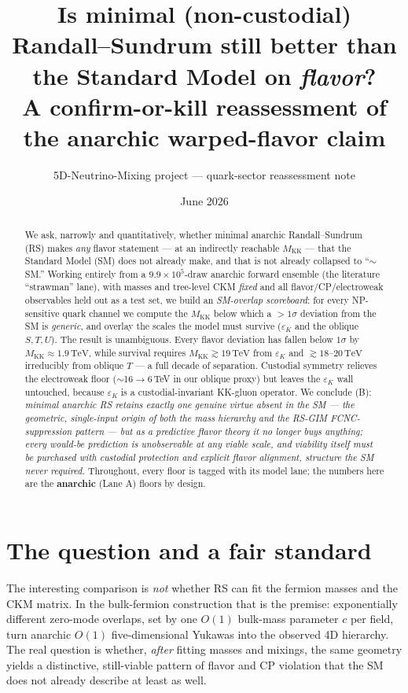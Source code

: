 \documentclass[11pt]{article}
\title{\bf Is minimal (non-custodial) Randall--Sundrum still better than the
Standard Model on \emph{flavor}?\\[4pt]
\large A confirm-or-kill reassessment of the anarchic warped-flavor claim}
\author{5D-Neutrino-Mixing project --- quark-sector reassessment note}
\date{June 2026}
\newcommand{\MKK}{M_{\mathrm{KK}}}
\newcommand{\epsK}{\varepsilon_K}
\newcommand{\TeV}{\,\mathrm{TeV}}
\begin{document}
\maketitle

\begin{abstract}
\noindent
We ask, narrowly and quantitatively, whether minimal anarchic Randall--Sundrum
(RS) makes \emph{any} flavor statement --- at an indirectly reachable
$\MKK$ --- that the Standard Model (SM) does not already make, and that is not
already collapsed to ``$\sim$\,SM.'' Working entirely from a $9.9\times10^{5}$-draw
anarchic forward ensemble (the literature ``strawman'' lane), with masses and
tree-level CKM \emph{fixed} and all flavor/CP/electroweak observables held out as
a test set, we build an \emph{SM-overlap scoreboard}: for every NP-sensitive
quark channel we compute the $\MKK$ below which a $>1\sigma$ deviation from the SM
is \emph{generic}, and overlay the scales the model must survive
($\epsK$ and the oblique $S,T,U$). The result is unambiguous. Every flavor
deviation has fallen below $1\sigma$ by $\MKK\!\approx\!1.9\TeV$, while survival
requires $\MKK\!\gtrsim\!19\TeV$ from $\epsK$ and $\gtrsim\!18\text{--}20\TeV$
irreducibly from oblique $T$ --- a full decade of separation. Custodial symmetry
relieves the electroweak floor ($\sim$16$\to$6\,TeV in our oblique proxy) but
leaves the $\epsK$ wall untouched, because $\epsK$ is a custodial-invariant
KK-gluon operator. We conclude (B): \emph{minimal anarchic RS retains exactly one
genuine virtue absent in the SM --- the geometric, single-input origin of both the
mass hierarchy and the RS-GIM FCNC-suppression pattern --- but as a predictive
flavor theory it no longer buys anything; every would-be prediction is
unobservable at any viable scale, and viability itself must be purchased with
custodial protection and explicit flavor alignment, structure the SM never
required.} Throughout, every floor is tagged with its model lane; the numbers
here are the \textbf{anarchic} (Lane A) floors by design.
\end{abstract}

\section{The question and a fair standard}
\label{sec:standard}

The interesting comparison is \emph{not} whether RS can fit the fermion masses and
the CKM matrix. In the bulk-fermion construction that is the premise: exponentially
different zero-mode overlaps, set by one $O(1)$ bulk-mass parameter $c$ per field,
turn anarchic $O(1)$ five-dimensional Yukawas into the observed 4D hierarchy. The
real question is whether, \emph{after} fitting masses and mixings, the same
geometry yields a distinctive, still-viable pattern of flavor and CP violation that
the SM does not already describe at least as well.
\end{document}
